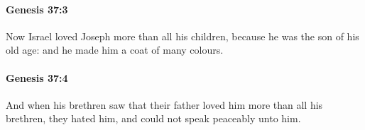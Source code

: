 		\paragraph{Genesis 37:3} %
			\label{GENESIS-37-3}

			Now Israel loved Joseph more than all his children, because he was the son of his old age: and he made him a coat of many colours.


		\paragraph{Genesis 37:4} %
			\label{GENESIS-37-4}

			And when his brethren saw that their father loved him more than all his brethren, they hated him, and could not speak peaceably unto him.


